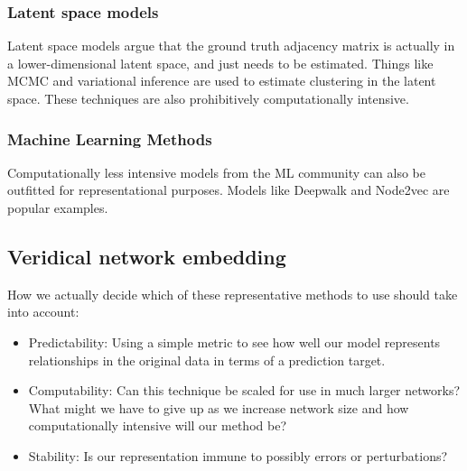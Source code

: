 \documentclass{article}
\begin{document}
\subsubsection{Latent space models}

Latent space models argue that the ground truth adjacency matrix is actually in a lower-dimensional latent space, and just needs to be estimated. Things like MCMC and variational inference are used to estimate clustering in the latent space. These techniques are also prohibitively computationally intensive. 

\subsubsection{Machine Learning Methods}

Computationally less intensive models from the ML community can also be outfitted for representational purposes. Models like Deepwalk and Node2vec are popular examples.

\subsection{Veridical network embedding}
How we actually decide which of these representative methods to use should take into account:
\begin{itemize}
\item Predictability: Using a simple metric to see how well our model represents relationships in the original data in terms of a prediction target.
\item Computability: Can this technique be scaled for use in much larger networks? What might we have to give up as we increase network size and how computationally intensive will our method be?
\item Stability: Is our representation immune to possibly errors or perturbations?
\end{itemize}
\end{document}
